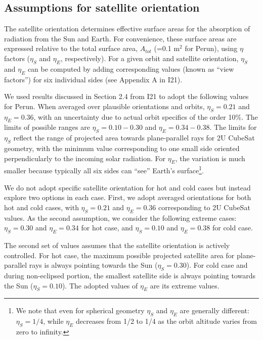 \documentclass[]{aastex62}
\begin{document}
\subsection{Assumptions for satellite orientation}

The satellite orientation determines effective surface areas for the absorption of radiation from 
the Sun and Earth. For convenience, these surface areas are expressed relative to the total surface area, $A_{tot}$
(=0.1 m$^2$ for Perun), using $\eta$ factors ($\eta_S$ and $\eta_E$, respectively). For a given 
orbit and satellite orientation, $\eta_S$ and $\eta_E$ can be computed by adding corresponding
values (known as ``view factors'') for six individual sides (see Appendix A in I21).  

We used results discussed in Section 2.4 from I21 to adopt the following values for Perun.
When averaged over plausible orientations and orbits, $\eta_S = 0.21$ and $\eta_E = 0.36$, 
with an uncertainty due to actual orbit specifics of the order 10\%. The limits of 
possible ranges are  $\eta_S = 0.10 - 0.30$ and $\eta_E = 0.34 - 0.38$. The limits for 
$\eta_S$ reflect the range of projected area towards plane-parallel rays for 2U CubeSat geometry, 
with the minimum value corresponding to one small side oriented perpendicularly to the incoming 
solar radiation. For $\eta_E$, the variation is much smaller because typically all six sides can 
``see'' Earth's surface\footnote{We note that even for spherical geometry $\eta_S$ and $\eta_E$
are generally different:  $\eta_S=1/4$, while $\eta_E$ decreases from 1/2 to 1/4 as the orbit
altitude varies from zero to infinity.}. 
 
We do not adopt specific satellite orientation for hot and cold cases but instead explore two 
options in each case.  First, we adopt averaged orientations for both hot and cold cases,
with $\eta_S = 0.21$ and $\eta_E = 0.36$ corresponding to 2U CubeSat values. As the second 
assumption, we consider the following extreme cases: $\eta_S = 0.30$ and $\eta_E = 0.34$ for 
hot case, and $\eta_S = 0.10$ and $\eta_E = 0.38$ for cold case.  
 
The second set of values assumes that the satellite orientation is actively controlled.  For hot
case, the maximum possible projected satellite area for plane-parallel rays is always pointing 
towards the Sun ($\eta_S = 0.30$). For cold case and during non-eclipsed portion, the smallest 
satellite side is always pointing towards the Sun ($\eta_S = 0.10$).  The adopted values of 
$\eta_E$ are its extreme values. 
\end{document}
